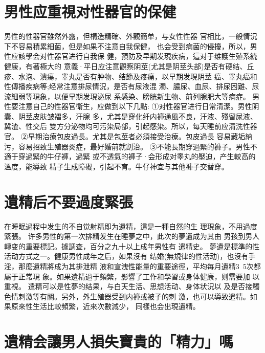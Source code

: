 \documentclass[12pt,UTF8]{ctexbook}
\begin{document}
\section{男性应重視对性器官的保健}

男性的性器官雖然外露，但構造精確、外觀簡单，与女性性器
官相比，一般情況下不容易積累細菌，但是如果不注意自我保健，
也会受到病菌的侵擾，所以，男性应該學会对性器官进行自我保
健，預防及早期发現疾病，這对于维護生殖系統健康，有著極大的
意義·平日应注意觀察阴莖(尤其是阴莖头部)是否有硬结、丘
疹、水泡、潰瘍，睾丸是否有肿物、结節及疼痛，以早期发現阴莖
癌、睾丸癌和性傳播疾病等;经常注意排尿情況，是否有尿液混
濁、膿尿、血尿、排尿困難、尿流細弱等現象，以便早期发現泌尿
系感染、膀胱新生物、前列腺肥大等病症。
男性要注意自己的性器官衛生，应做到以下几點:
①对性器官进行日常清潔。男性阴囊、阴莖皮肤皱褶多，汗腺
多，尤其是穿化纤内褲通風不良，汗液、殘留尿液、冀渣、性交后
雙方分泌物均可污染局部，引起感染。所以，每天睡前应清洗性器
官。
②早期治療包皮過長。尤其是包莖者必須接受治療。包皮過長
容易藏垢納污，容易招致生殖器炎症，最好婚前就割治。
③不能長期穿過緊的褲子。男性不適于穿過緊的牛仔褲，過緊
或不透氣的褲子·会形成对睾丸的壓迫，产生較高的溫度，能導致
精子生成障礙，引起不育。牛仔神宜与其他褲子交替穿。

\section{遺精后不要過度緊張}

在睡眠過程中发生的不自觉射精即为遺精，這是一種自然的生
理現象，不用過度緊張。
许多男性的第一次排精发生在睡夢之中，此次的夢遺成为其由
男孩到男人轉变的重要標記。據調查，百分之九十以上成年男性有
遣精史。
夢遺是標準的性活动方式之一。健康男性成年之后，如果沒有
结婚(無規律的性活动)，也沒有手淫，那麼遺精將成为其排泄精
液和宣洩性能量的重要途徑，平均每月遺精3~5次都屬于正常現
象。如果遺精過于頻繁，影響了工作和學習或身体健康，则需要加
以重視。
遣精可以是性夢的结果，与白天生活、思想活动、身体状況以
及是否接觸色情刺激等有關。另外，外生殖器受到内褲或被子的刺
激，也可以導致遣精。如果原來性生活比較頻繁，近來次數減少，
同樣也会出現遺精。

\section{遺精会讓男人損失寶貴的「精力」嗎}
\end{document}
